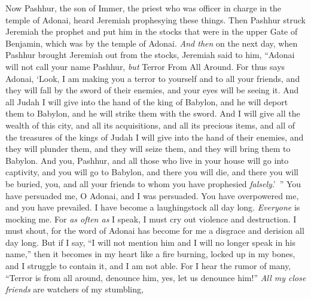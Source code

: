 \begin{biblechapter} %
 Now Pashhur, the son of Immer, the priest who was officer in charge in the temple of Adonai, heard Jeremiah prophesying these things.
\verse Then Pashhur struck Jeremiah the prophet and put him in the stocks that were in the upper Gate of Benjamin, which was by the temple of Adonai.
\verse \textit{And then} on the next day, when Pashhur brought Jeremiah out from the stocks, Jeremiah said to him, “Adonai will not call your name Pashhur, \textit{but} Terror From All Around.
\verse For thus says Adonai, ‘Look, I am making you a terror to yourself and to all your friends, and they will fall by the sword of their enemies, and your eyes will be seeing it. And all Judah I will give into the hand of the king of Babylon, and he will deport them to Babylon, and he will strike them with the sword.
\verse And I will give all the wealth of this city, and all its acquisitions, and all its precious items, and all of the treasures of the kings of Judah I will give into the hand of their enemies, and they will plunder them, and they will seize them, and they will bring them to Babylon.
\verse And you, Pashhur, and all those who live in your house will go into captivity, and you will go to Babylon, and there you will die, and there you will be buried, you, and all your friends to whom you have prophesied \textit{falsely}.’ ”
 You have persuaded me, O Adonai, and I was persuaded. 
You have overpowered me, and you have prevailed. 
I have become a laughingstock all day long. 
\textit{Everyone} is mocking me.
\verse For \textit{as often as} I speak, 
I must cry out violence and destruction. 
I must shout, for the word of Adonai has become for me 
a disgrace and derision all day long.
\verse But if I say, “I will not mention him 
and I will no longer speak in his name,” 
then it becomes in my heart like a fire burning, 
locked up in my bones, 
and I struggle to contain it, 
and I am not able.
\verse For I hear the rumor of many, 
“Terror is from all around, denounce him, 
yes, let us denounce him!” 
\textit{All my close friends} are watchers of my stumbling, 

\end{biblechapter}
